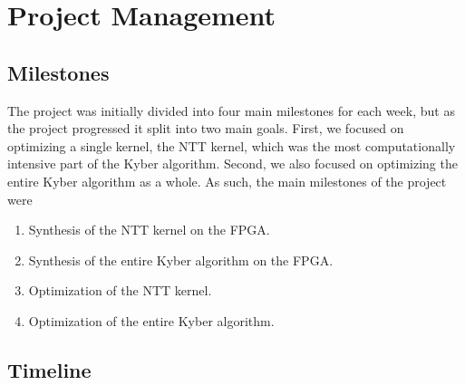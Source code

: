 
\section*{Project Management}

\subsection*{Milestones}

The project was initially divided into four main milestones for each week, but as the project progressed it split into two main goals. First, we focused on optimizing a single kernel, the NTT kernel, which was the most computationally intensive part of the Kyber algorithm. Second, we also focused on optimizing the entire Kyber algorithm as a whole. As such, the main milestones of the project were \begin{enumerate}
  \item Synthesis of the NTT kernel on the FPGA.
  \item Synthesis of the entire Kyber algorithm on the FPGA.
  \item Optimization of the NTT kernel.
  \item Optimization of the entire Kyber algorithm.
\end{enumerate}

\subsection*{Timeline}

